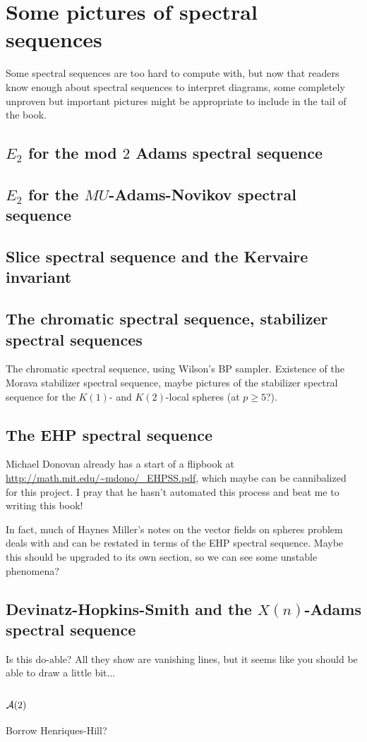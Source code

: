 \chapter{Some pictures of spectral sequences}

Some spectral sequences are too hard to compute with, but now that readers know enough about spectral sequences to interpret diagrams, some completely unproven but important pictures might be appropriate to include in the tail of the book.

\section{$E_2$ for the mod $2$ Adams spectral sequence}

\section{$E_2$ for the $MU$-Adams-Novikov spectral sequence}

\section{Slice spectral sequence and the Kervaire invariant}

\section{The chromatic spectral sequence, stabilizer spectral sequences}

The chromatic spectral sequence, using Wilson's BP sampler.  Existence of the Morava stabilizer spectral sequence, maybe pictures of the stabilizer spectral sequence for the $K(1)$- and $K(2)$-local spheres (at $p \ge 5$?).

\section{The EHP spectral sequence}

Michael Donovan already has a start of a flipbook at \url{http://math.mit.edu/~mdono/\_EHPSS.pdf}, which maybe can be cannibalized for this project.  I pray that he hasn't automated this process and beat me to writing this book!

In fact, much of Haynes Miller's notes on the vector fields on spheres problem deals with and can be restated in terms of the EHP spectral sequence.  Maybe this should be upgraded to its own section, so we can see some unstable phenomena?

\section{Devinatz-Hopkins-Smith and the $X(n)$-Adams spectral sequence}

Is this do-able?  All they show are vanishing lines, but it seems like you should be able to draw a little bit...

\section{$\mathcal{A}(2)$}

Borrow Henriques-Hill?
